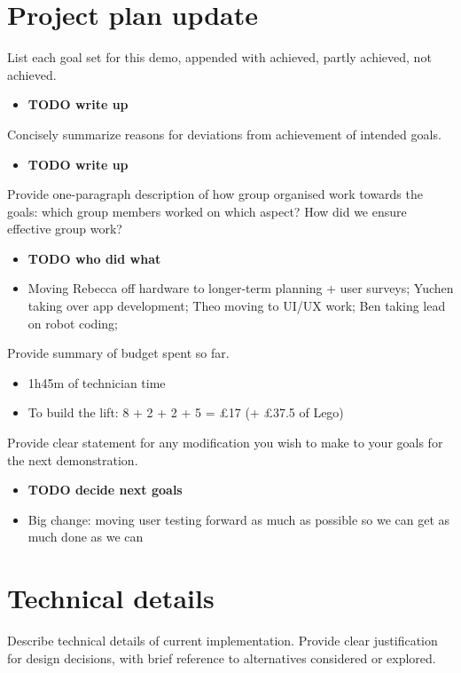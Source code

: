 \documentclass{article}
\begin{document}
 


\begin{abstract}

\end{abstract} 

\section{Project plan update}
List each goal set for this demo, appended with achieved, partly achieved, not achieved.
\begin{itemize}
\item {\bf TODO write up}
\end{itemize}

Concisely summarize reasons for deviations from achievement of intended goals. 
\begin{itemize}
\item {\bf TODO write up}
\end{itemize}

Provide one-paragraph description of how group organised work towards the goals: which group members worked on which aspect? How did we ensure effective group work?
\begin{itemize}
\item {\bf TODO who did what}
\item Moving Rebecca off hardware to longer-term planning + user surveys; Yuchen taking over app development; Theo moving to UI/UX work; Ben taking lead on robot coding; 
\end{itemize}

Provide summary of budget spent so far.
\begin{itemize}
\item 1h45m of technician time
\item To build the lift: 8 + 2 + 2 + 5 = \pounds 17 (+ \pounds 37.5 of Lego)
\end{itemize}

Provide clear statement for any modification you wish to make to your goals for the next demonstration.
\begin{itemize}
\item {\bf TODO decide next goals}
\item Big change: moving user testing forward as much as possible so we can get as much done as we can
\end{itemize}

\section{Technical details}
Describe technical details of current implementation. Provide clear justification for design decisions, with brief reference to alternatives considered or explored.
\end{document}
